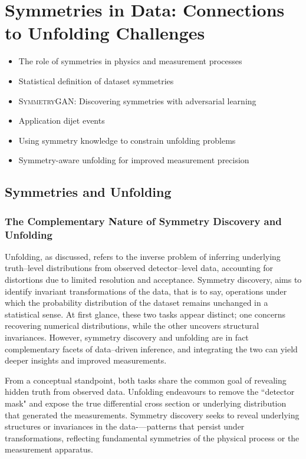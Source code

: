 \chapter{Symmetries in Data: Connections to Unfolding Challenges}
\label{chap:symmetrygan}
\begin{itemize}
    \item The role of symmetries in physics and measurement processes
    \item Statistical definition of dataset symmetries
    \item \textsc{SymmetryGAN}: Discovering symmetries with adversarial learning
    \item Application dijet events
    \item Using symmetry knowledge to constrain unfolding problems
    \item Symmetry-aware unfolding for improved measurement precision
\end{itemize}
\section{Symmetries and Unfolding}
    \subsection{The Complementary Nature of Symmetry Discovery and Unfolding}
        Unfolding, as discussed, refers to the inverse problem of inferring underlying truth--level distributions from observed detector--level data, accounting for distortions due to limited resolution and acceptance.
        Symmetry discovery, aims to identify invariant transformations of the data, that is to say, operations under which the probability distribution of the dataset remains unchanged in a statistical sense.
        At first glance, these two tasks appear distinct;
        one concerns recovering numerical distributions, while the other uncovers structural invariances.
        However, symmetry discovery and unfolding are in fact complementary facets of data--driven inference, and integrating the two can yield deeper insights and improved measurements.
    
        From a conceptual standpoint, both tasks share the common goal of revealing hidden truth from observed data.
        Unfolding endeavours to remove the ``detector mask" and expose the true differential cross section or underlying distribution that generated the measurements.
        Symmetry discovery seeks to reveal underlying structures or invariances in the data-—patterns that persist under transformations, reflecting fundamental symmetries of the physical process or the measurement apparatus.
    
